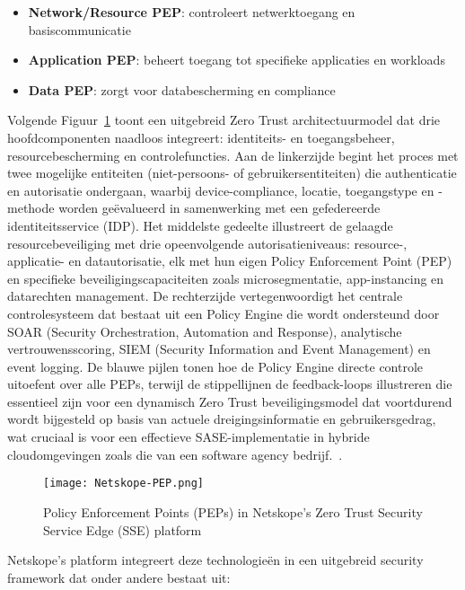 \begin{itemize}
  \item \textbf{Network/Resource PEP}: controleert netwerktoegang en basiscommunicatie
  \item \textbf{Application PEP}: beheert toegang tot specifieke applicaties en workloads
  \item \textbf{Data PEP}: zorgt voor databescherming en compliance
\end{itemize}

Volgende Figuur~\ref{fig:Netskope-PEP} toont een uitgebreid Zero Trust architectuurmodel dat drie hoofdcomponenten naadloos integreert: identiteits- en toegangsbeheer, resourcebescherming en controlefuncties. Aan de linkerzijde begint het proces met twee mogelijke entiteiten (niet-persoons- of gebruikersentiteiten) die authenticatie en autorisatie ondergaan, waarbij device-compliance, locatie, toegangstype en -methode worden geëvalueerd in samenwerking met een gefedereerde identiteitsservice (IDP). Het middelste gedeelte illustreert de gelaagde resourcebeveiliging met drie opeenvolgende autorisatieniveaus: resource-, applicatie- en datautorisatie, elk met hun eigen Policy Enforcement Point (PEP) en specifieke beveiligingscapaciteiten zoals microsegmentatie, app-instancing en datarechten management. De rechterzijde vertegenwoordigt het centrale controlesysteem dat bestaat uit een Policy Engine die wordt ondersteund door SOAR (Security Orchestration, Automation and Response), analytische vertrouwensscoring, SIEM (Security Information and Event Management) en event logging. De blauwe pijlen tonen hoe de Policy Engine directe controle uitoefent over alle PEPs, terwijl de stippellijnen de feedback-loops illustreren die essentieel zijn voor een dynamisch Zero Trust beveiligingsmodel dat voortdurend wordt bijgesteld op basis van actuele dreigingsinformatie en gebruikersgedrag, wat cruciaal is voor een effectieve SASE-implementatie in hybride cloudomgevingen zoals die van een software agency bedrijf.~\autocite{Netskope2024}.
\begin{figure}[h!]
  \centering
  \texttt{[image: Netskope-PEP.png]}
  \caption[]{Policy Enforcement Points (PEPs) in Netskope's Zero Trust Security Service Edge (SSE) platform~\autocite{Netskope2024}}
  \label{fig:Netskope-PEP}
\end{figure}


 Netskope's platform integreert deze technologieën in een uitgebreid security framework dat onder andere bestaat uit:

